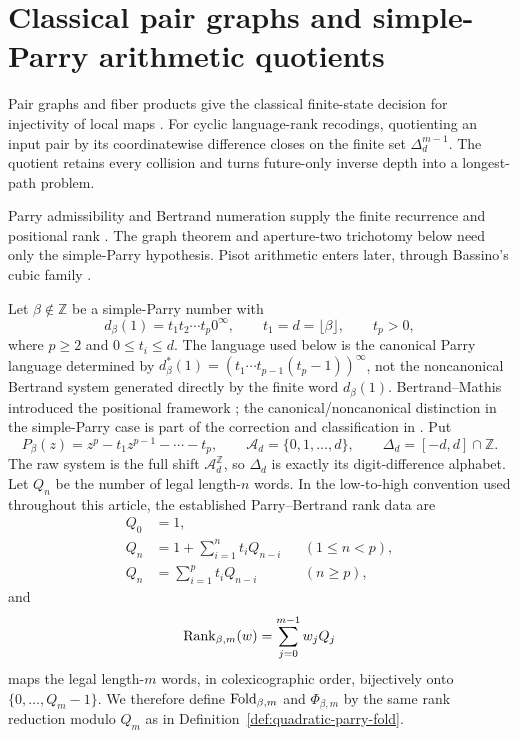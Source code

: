 \section{Classical pair graphs and simple-Parry arithmetic quotients}
\label{sec:simple-parry-causal-obstructions}

Pair graphs and fiber products give the classical finite-state decision for
injectivity of local maps
\cite{AmorosoPatt1972,Richardson1972,Nasu1977,Head1989,LindMarcus1995,Nasu1995}.
For cyclic language-rank recodings, quotienting an input pair by its
coordinatewise difference closes on the finite set $\Delta_d^{m-1}$.  The
quotient retains every collision and turns future-only inverse depth into a
longest-path problem.

Parry admissibility and Bertrand numeration supply the finite recurrence and
positional rank \cite{Parry1960,BertrandMathis1989,
CharlierCisterninoStipulanti2022}.  The graph theorem and aperture-two
trichotomy below need only the simple-Parry hypothesis.  Pisot arithmetic
enters later, through Bassino's cubic family \cite{Bassino2002}.

Let $\beta\notin\mathbb Z$ be a simple-Parry number with
\[
d_\beta(1)=t_1t_2\cdots t_p0^\infty,
\qquad t_1=d=\lfloor\beta\rfloor,
\qquad t_p>0,
\]
where $p\ge2$ and $0\le t_i\le d$.  The language used below is the canonical
Parry language determined by
$d_\beta^*(1)=(t_1\cdots t_{p-1}(t_p-1))^\infty$, not the noncanonical
Bertrand system generated directly by the finite word $d_\beta(1)$.
Bertrand--Mathis introduced the positional framework
\cite{BertrandMathis1989}; the canonical/noncanonical distinction in the
simple-Parry case is part of the correction and classification in
\cite{CharlierCisterninoStipulanti2022}.  Put
\[
P_\beta(z)=z^p-t_1z^{p-1}-\cdots-t_p,
\qquad
\mathcal A_d=\{0,1,\ldots,d\},
\qquad
\Delta_d=[-d,d]\cap\mathbb Z.
\]
The raw system is the full shift $\mathcal A_d^{\mathbb Z}$, so $\Delta_d$
is exactly its digit-difference alphabet.  Let $Q_n$ be the number of legal
length-$n$ words.  In the low-to-high convention used throughout this
article, the established Parry--Bertrand rank data are
\begin{align}
Q_0&=1,\nonumber\\
Q_n&=1+\sum_{i=1}^n t_iQ_{n-i} &&(1\le n<p),\label{eq:simple-parry-Q}\\
Q_n&=\sum_{i=1}^p t_iQ_{n-i} &&(n\ge p),\nonumber
\end{align}
and
\[
\operatorname{Rank}_{\beta,m}(w)=\sum_{j=0}^{m-1}w_jQ_j
\]
maps the legal length-$m$ words, in colexicographic order, bijectively onto
$\{0,\ldots,Q_m-1\}$.  We therefore define $\mathrm{Fold}_{\beta,m}$ and
$\Phi_{\beta,m}$ by the same rank reduction modulo $Q_m$ as in
Definition~\ref{def:quadratic-parry-fold}.

